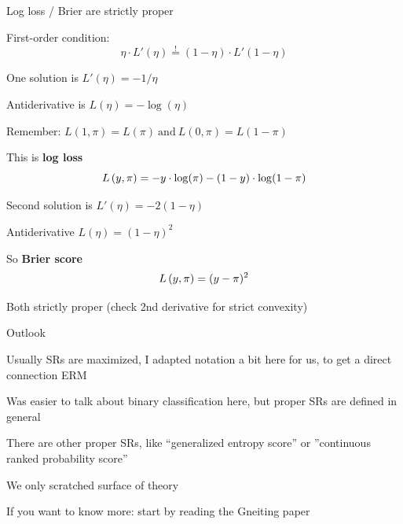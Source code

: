 \documentclass[11pt,compress,t,notes=noshow, xcolor=table]{beamer}
\begin{document}
\begin{framei}[sep=M]{Log loss / Brier are strictly proper}

\item First-order condition: 
$$\eta \cdot L'(\eta) \overset{!}{=} (1-\eta) \cdot L'(1-\eta)$$
\item One solution is $L'(\eta)=-1/\eta$ %
\item Antiderivative is $L(\eta)=-\log(\eta)$ 
\item Remember: 
$L(1, \pi) = L(\pi) \ \text{and} \ L(0, \pi) = L(1-\pi)$
\item This is \textbf{log loss} 
$$L\left(y, \pi\right)=-y \cdot \log(\pi) - (1-y) \cdot \log(1-\pi)$$

\item Second solution is $L'(\eta)=-2(1-\eta)$%
\item Antiderivative $L(\eta)=(1-\eta)^2$%
\item So \textbf{Brier score} 
$$L\left(y, \pi\right)=(y - \pi)^2$$


\item Both strictly proper (check 2nd derivative for strict convexity)


\end{framei}

\begin{framei}[sep=L]{Outlook}

\item Usually SRs are maximized, I adapted notation a bit here
for us, to get a direct connection ERM

\item Was easier to talk about binary classification here, 
but proper SRs are defined in general

\item There are other proper SRs, like ``generalized entropy score'' or ''continuous ranked probability score'' 

\item We only scratched surface of theory

\item  If you want to know more: start by reading the Gneiting paper

\end{framei}



\endlecture
\end{document}
